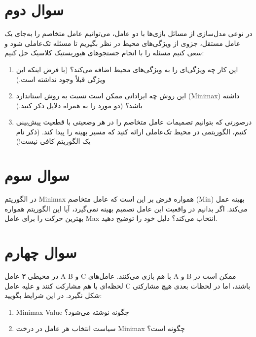 \documentclass[a4paper,10pt]{article}
\begin{document}
	\bigskip
	\hline
	
	
	\bigskip
	
	\section{سوال دوم}
	
	در نوعی مدل‌سازی از مسائل بازی‌ها با دو عامل، می‌توانیم عامل متخاصم را به‌جای یک عامل مستقل، جزوی از ویژگی‌های محیط در نظر بگیریم تا مسئله تک‌عاملی شود و سعی کنیم مسئله را با انجام جستجوهای هیوریستیک کلاسیک حل کنیم:
	
	\begin{enumerate}[label=\alph*)]
		\item این کار چه ویژگی‌ای را به ویژگی‌های محیط اضافه می‌کند؟ (با فرض اینکه این ویژگی قبلاً وجود نداشته است.)
		
		\item این روش چه ایرادانی ممکن است نسبت به روش استاندارد (Minimax) داشته باشد؟ (دو مورد را به همراه دلایل ذکر کنید.)
		
		\item درصورتی که بتوانیم تصمیمات عامل متخاصم را در هر وضعیتی با قطعیت پیش‌بینی کنیم، الگوریتمی در محیط تک‌عاملی ارائه کنید که مسیر بهینه را پیدا کند. (ذکر نام یک الگوریتم کافی نیست!)
	\end{enumerate}
	
	
	\bigskip
	\bigskip
	\hline
	
	
	\bigskip
	\section{سوال سوم}
	
	در الگوریتم Minimax همواره فرض بر این است که عامل متخاصم (Min) بهینه عمل می‌کند. اگر بدانیم در واقعیت این عامل تصمیم بهینه نمی‌گیرد، آیا این الگوریتم همواره بهترین حرکت را برای عامل Max انتخاب می‌کند؟ دلیل خود را توضیح دهید.
	
	\bigskip
	\bigskip
	\hline
	
	
	\bigskip
	
	\section{سوال چهارم}
	
	در محیطی ۳ عامل A  B و C با هم بازی می‌کنند. عامل‌های A و B ممکن است در لحظه‌ای با هم مشارکت کنند و علیه عامل C باشند، اما در لحظات بعدی هیچ مشارکتی شکل نگیرد. در این شرایط بگویید:
	
	\begin{enumerate}[label=\alph*)]
		\item Minimax Value چگونه نوشته می‌شود؟
		
		\item سیاست انتخاب هر عامل در درخت Minimax چگونه است؟
	\end{enumerate}
	
\end{document}

